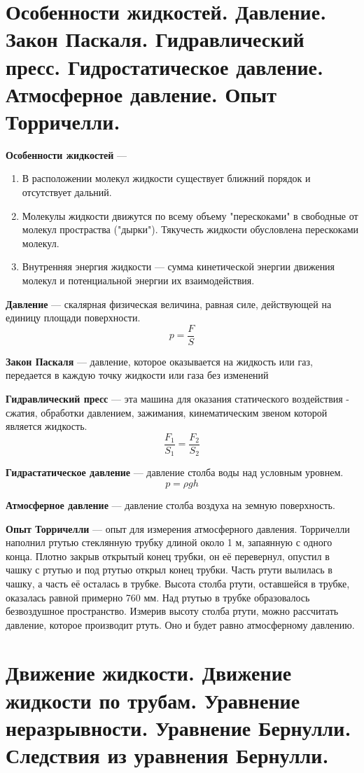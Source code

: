 \documentclass{report}
\begin{document}
\part{Особенности жидкостей. 
Давление. 
Закон Паскаля.
Гидравлический пресс.
Гидростатическое давление. 
Атмосферное давление. 
Опыт Торричелли.}

{\bf Особенности жидкостей} ---
\begin{enumerate}
  \item В расположении молекул жидкости существует ближний порядок и отсутствует дальний.
  \item Молекулы жидкости движутся по всему объему "перескоками" в свободные от молекул
    простраства ("дырки"). Тякучесть жидкости обусловлена перескоками молекул.
  \item Внутренняя энергия жидкости --- сумма кинетической энергии движения молекул и 
    потенциальной энергии их взаимодействия.
\end{enumerate}

{\bf Давление} ---
скалярная физическая величина, равная силе, действующей на единицу площади поверхности. 
$$
p=\frac{F}{S}
$$

{\bf Закон Паскаля} ---
давление, которое оказывается на жидкость или газ, передается в каждую точку 
жидкости или газа без изменений

{\bf Гидравлический пресс} ---
эта машина для оказания статического воздействия - 
сжатия, обработки давлением, зажимания, кинематическим звеном которой является жидкость.
$$
\frac{F_1}{S_1}=\frac{F_2}{S_2}
$$

{\bf Гидрастатическое давление} ---
давление столба воды над условным уровнем. 
$$
p=\rho gh
$$

{\bf Атмосферное давление} ---
давление столба воздуха на земную поверхность.

{\bf Опыт Торричелли} ---
опыт для измерения атмосферного давления. Торричелли наполнил ртутью 
стеклянную трубку длиной около 1 м, запаянную с одного конца. Плотно закрыв 
открытый конец трубки, он её перевернул, опустил в чашку с ртутью и под ртутью 
открыл конец трубки. Часть ртути вылилась в чашку, а часть её осталась в трубке. 
Высота столба ртути, оставшейся в трубке, оказалась равной примерно 760 мм. Над 
ртутью в трубке образовалось безвоздушное пространство.
Измерив высоту столба ртути, можно рассчитать давление, которое производит ртуть. 
Оно и будет равно атмосферному давлению.



\part{Движение жидкости. 
Движение жидкости по трубам. 
Уравнение неразрывности. 
Уравнение Бернулли. 
Следствия из уравнения Бернулли.}
\end{document}
